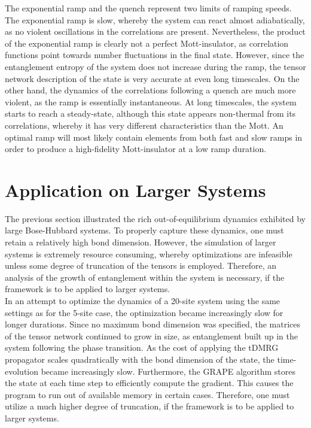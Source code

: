 The exponential ramp and the quench represent two limits of ramping speeds. The exponential ramp is slow, whereby the system can react almost adiabatically, as no violent oscillations in the correlations are present. Nevertheless, the product of the exponential ramp is clearly not a perfect Mott-insulator, as correlation functions point towards number fluctuations in the final state. However, since the entanglement entropy of the system does not increase during the ramp, the tensor network description of the state is very accurate at even long timescales.
On the other hand, the dynamics of the correlations following a quench are much more violent, as the ramp is essentially instantaneous. At long timescales, the system starts to reach a steady-state, although this state appears non-thermal from its correlations, whereby it has very different characteristics than the Mott. An optimal ramp will most likely contain elements from both fast and slow ramps in order to produce a high-fidelity Mott-insulator at a low ramp duration. 



\section{Application on Larger Systems} \label{sec:appLargeSystems}

The previous section illustrated the rich out-of-equilibrium dynamics exhibited by large Bose-Hubbard systems. To properly capture these dynamics, one must retain a relatively high bond dimension. However, the simulation of larger systems is extremely resource consuming, whereby optimizations are infeasible unless some degree of truncation of the tensors is employed. Therefore, an analysis of the growth of entanglement within the system is necessary, if the framework is to be applied to larger systems.\\

In an attempt to optimize the dynamics of a 20-site system using the same settings as for the 5-site case, the optimization became increasingly slow for longer durations. Since no maximum bond dimension was specified, the matrices of the tensor network continued to grow in size, as entanglement built up in the system following the phase transition. As the cost of applying the tDMRG propagator scales quadratically with the bond dimension of the state, the time-evolution became increasingly slow. Furthermore, the GRAPE algorithm stores the state at each time step to efficiently compute the gradient. This causes the program to run out of available memory in certain cases. Therefore, one must utilize a much higher degree of truncation, if the framework is to be applied to larger systems.

